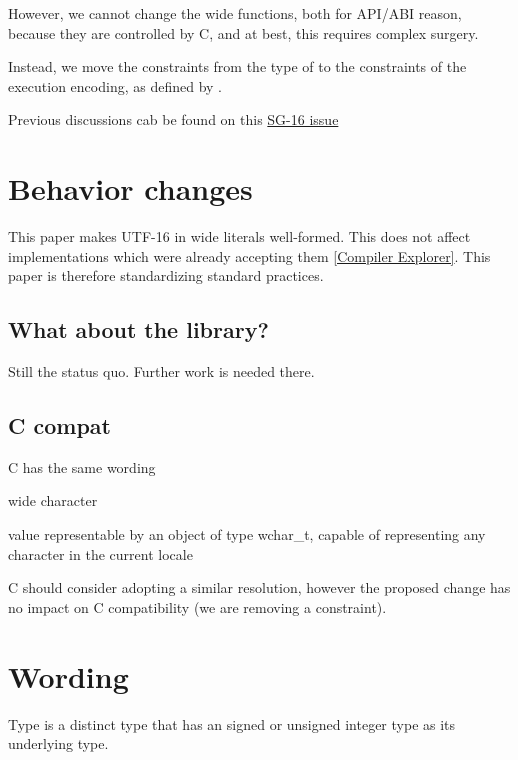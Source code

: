 \documentclass{wg21}
\begin{document}
However, we cannot change the wide functions, both for API/ABI reason, because they are controlled by C,
and at best, this requires complex surgery.

Instead, we move the constraints from the type of  to the constraints of the execution encoding,
as defined by .

Previous discussions cab be found on this \href{https://github.com/sg16-unicode/sg16/issues/9}{SG-16 issue}

\section{Behavior changes}

This paper makes UTF-16 in wide literals well-formed. This does not affect implementations which were already accepting them \href{https://godbolt.org/z/cPe69bshM}{[Compiler Explorer]}.
This paper is therefore standardizing standard practices.

\subsection{What about the library?}

Still the status quo. Further work is needed there.

\subsection{C compat}

C has the same wording

\begin{quoteblock}
wide character

value representable by an object of type wchar_t, capable of representing any character in the current locale
\end{quoteblock}

C should consider adopting a similar resolution, however the proposed change has no impact on C compatibility
(we are removing a constraint).


\section{Wording}


\pnum
{}%
%
%
Type  is a distinct type that has
an 
signed or unsigned integer type as its underlying type.
\end{document}
